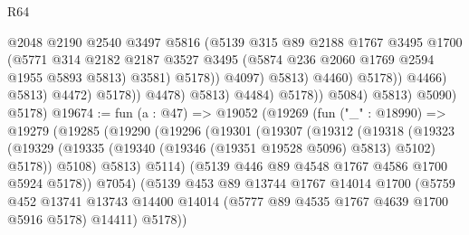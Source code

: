 \begin{lexlean}{R64}
\begin{coremodule}
                                            @2048
                                            @2190
                                            @2540
                                            @3497
                                            @5816
                                            (@5139
                                              @315
                                              @89
                                              @2188
                                              @1767
                                              @3495
                                              @1700
                                              (@5771
                                                @314
                                                @2182
                                                @2187
                                                @3527
                                                @3495
                                                (@5874 @236 @2060 @1769 @2594 @1955 @5893 @5813)
                                                @3581)
                                              @5178))
                                          @4097)
                                        @5813)
                                      @4460)
                                    @5178))
                                @4466)
                              @5813)
                            @4472)
                          @5178))
                      @4478)
                    @5813)
                  @4484)
                @5178))
            @5084)
          @5813)
        @5090)
      @5178)
@19674 := fun (a : @47) =>
  @19052
    (@19269
      (fun ("_" : @18990) =>
      @19279
        (@19285
          (@19290
            (@19296
              (@19301
                (@19307
                  (@19312
                    (@19318
                      (@19323
                        (@19329 (@19335 (@19340 (@19346 (@19351 @19528 @5096) @5813) @5102) @5178))
                        @5108)
                      @5813)
                    @5114)
                  (@5139 @446 @89 @4548 @1767 @4586 @1700 @5924 @5178))
                @7054)
              (@5139
                @453
                @89
                @13744
                @1767
                @14014
                @1700
                (@5759
                  @452
                  @13741
                  @13743
                  @14400
                  @14014
                  (@5777 @89 @4535 @1767 @4639 @1700 @5916 @5178)
                  @14411)
                @5178))

\end{coremodule}
\end{lexlean}
